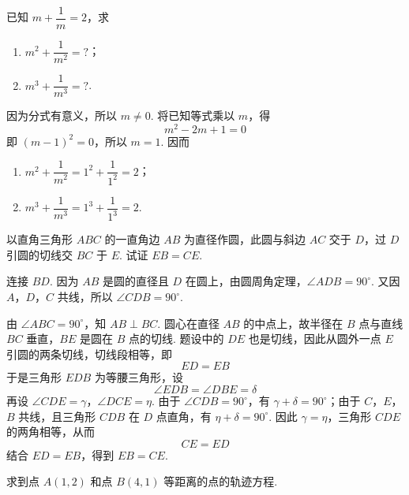 \begin{problem}
已知 \(m+\dfrac{1}{m}=2\)，求

\begin{enumerate}
\item \(m^2+\dfrac{1}{m^2}=?\)；
\item \(m^3+\dfrac{1}{m^3}=?\).
\end{enumerate}
\end{problem}

\begin{solution}
因为分式有意义，所以 \(m\neq0\). 将已知等式乘以 \(m\)，得
\[
m^2-2m+1=0
\]
即 \((m-1)^2=0\)，所以 \(m=1\). 因而
\begin{enumerate}
\item \(m^2+\dfrac{1}{m^2}=1^2+\dfrac{1}{1^2}=2\)；
\item \(m^3+\dfrac{1}{m^3}=1^3+\dfrac{1}{1^3}=2\).
\end{enumerate}
\end{solution}

\begin{problem}
以直角三角形 \(ABC\) 的一直角边 \(AB\) 为直径作圆，此圆与斜边 \(AC\) 交于 \(D\)，过 \(D\) 引圆的切线交 \(BC\) 于 \(E\). 试证 \(EB=CE\).

\end{problem}

\begin{solution}
连接 \(BD\). 因为 \(AB\) 是圆的直径且 \(D\) 在圆上，由圆周角定理，\(\angle ADB=90^\circ\). 又因 \(A\)，\(D\)，\(C\) 共线，所以 \(\angle CDB=90^\circ\).

由 \(\angle ABC=90^\circ\)，知 \(AB\perp BC\). 圆心在直径 \(AB\) 的中点上，故半径在 \(B\) 点与直线 \(BC\) 垂直，\(BE\) 是圆在 \(B\) 点的切线. 题设中的 \(DE\) 也是切线，因此从圆外一点 \(E\) 引圆的两条切线，切线段相等，即
\[
ED=EB
\]
于是三角形 \(EDB\) 为等腰三角形，设
\[
\angle EDB=\angle DBE=\delta
\]
再设 \(\angle CDE=\gamma\)，\(\angle DCE=\eta\). 由于 \(\angle CDB=90^\circ\)，有 \(\gamma+\delta=90^\circ\)；由于 \(C\)，\(E\)，\(B\) 共线，且三角形 \(CDB\) 在 \(D\) 点直角，有 \(\eta+\delta=90^\circ\). 因此 \(\gamma=\eta\)，三角形 \(CDE\) 的两角相等，从而
\[
CE=ED
\]
结合 \(ED=EB\)，得到 \(EB=CE\).
\end{solution}

\begin{problem}
求到点 \(A\left(1,2\right)\) 和点 \(B\left(4,1\right)\) 等距离的点的轨迹方程.
\end{problem}

